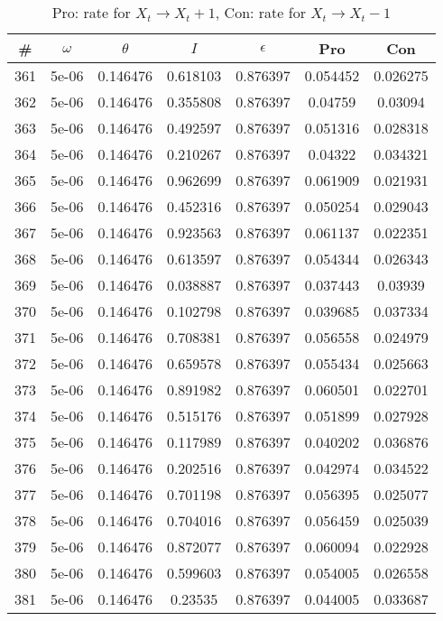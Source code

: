 \newpage
\begin{table}
\caption{Pro: rate for $X_t \rightarrow X_t + 1$, Con: rate for $X_t \rightarrow X_t - 1$}
\begin{tabular*}{\linewidth}{c|c|c|c|c|c|c}
\# & $\omega$ & $\theta$ & $I$ & $\epsilon$ & Pro & Con \\
\hline
361 & 5e-06 & 0.146476 & 0.618103 & 0.876397 & 0.054452 & 0.026275\\
362 & 5e-06 & 0.146476 & 0.355808 & 0.876397 & 0.04759 & 0.03094\\
363 & 5e-06 & 0.146476 & 0.492597 & 0.876397 & 0.051316 & 0.028318\\
364 & 5e-06 & 0.146476 & 0.210267 & 0.876397 & 0.04322 & 0.034321\\
365 & 5e-06 & 0.146476 & 0.962699 & 0.876397 & 0.061909 & 0.021931\\
366 & 5e-06 & 0.146476 & 0.452316 & 0.876397 & 0.050254 & 0.029043\\
367 & 5e-06 & 0.146476 & 0.923563 & 0.876397 & 0.061137 & 0.022351\\
368 & 5e-06 & 0.146476 & 0.613597 & 0.876397 & 0.054344 & 0.026343\\
369 & 5e-06 & 0.146476 & 0.038887 & 0.876397 & 0.037443 & 0.03939\\
370 & 5e-06 & 0.146476 & 0.102798 & 0.876397 & 0.039685 & 0.037334\\
371 & 5e-06 & 0.146476 & 0.708381 & 0.876397 & 0.056558 & 0.024979\\
372 & 5e-06 & 0.146476 & 0.659578 & 0.876397 & 0.055434 & 0.025663\\
373 & 5e-06 & 0.146476 & 0.891982 & 0.876397 & 0.060501 & 0.022701\\
374 & 5e-06 & 0.146476 & 0.515176 & 0.876397 & 0.051899 & 0.027928\\
375 & 5e-06 & 0.146476 & 0.117989 & 0.876397 & 0.040202 & 0.036876\\
376 & 5e-06 & 0.146476 & 0.202516 & 0.876397 & 0.042974 & 0.034522\\
377 & 5e-06 & 0.146476 & 0.701198 & 0.876397 & 0.056395 & 0.025077\\
378 & 5e-06 & 0.146476 & 0.704016 & 0.876397 & 0.056459 & 0.025039\\
379 & 5e-06 & 0.146476 & 0.872077 & 0.876397 & 0.060094 & 0.022928\\
380 & 5e-06 & 0.146476 & 0.599603 & 0.876397 & 0.054005 & 0.026558\\
381 & 5e-06 & 0.146476 & 0.23535 & 0.876397 & 0.044005 & 0.033687\\

\end{tabular*}
\end{table}
